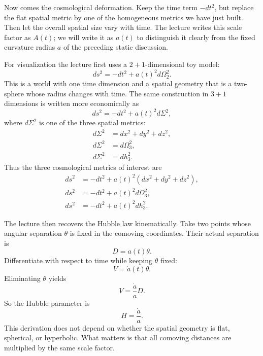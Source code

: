 Now comes the cosmological deformation. Keep the time term \(-dt^2\), but replace the flat spatial metric by one of the homogeneous metrics we have just built. Then let the overall spatial size vary with time. The lecture writes this scale factor as \(A(t)\); we will write it as \(a(t)\) to distinguish it clearly from the fixed curvature radius \(a\) of the preceding static discussion.

For visualization the lecture first uses a \(2+1\)-dimensional toy model:
\begin{equation}
ds^2 = -dt^2 + a(t)^2 d\Omega_2^2.
\end{equation}
This is a world with one time dimension and a spatial geometry that is a two-sphere whose radius changes with time. The same construction in \(3+1\) dimensions is written more economically as
\begin{equation}
ds^2 = -dt^2 + a(t)^2 d\Sigma^2,
\end{equation}
where \(d\Sigma^2\) is one of the three spatial metrics:
\begin{align}
d\Sigma^2 &= dx^2 + dy^2 + dz^2,\\
d\Sigma^2 &= d\Omega_3^2,\\
d\Sigma^2 &= dh_3^2.
\end{align}
Thus the three cosmological metrics of interest are
\begin{align}
ds^2 &= -dt^2 + a(t)^2 \left(dx^2+dy^2+dz^2\right),\\
ds^2 &= -dt^2 + a(t)^2 d\Omega_3^2,\\
ds^2 &= -dt^2 + a(t)^2 dh_3^2.
\end{align}

The lecture then recovers the Hubble law kinematically. Take two points whose angular separation \(\theta\) is fixed in the comoving coordinates. Their actual separation is
\begin{equation}
D = a(t)\theta.
\end{equation}
Differentiate with respect to time while keeping \(\theta\) fixed:
\begin{equation}
V = \dot a(t)\theta.
\end{equation}
Eliminating \(\theta\) yields
\begin{equation}
V = \frac{\dot a}{a} D.
\end{equation}
So the Hubble parameter is
\begin{equation}
H = \frac{\dot a}{a}.
\end{equation}
This derivation does not depend on whether the spatial geometry is flat, spherical, or hyperbolic. What matters is that all comoving distances are multiplied by the same scale factor.

